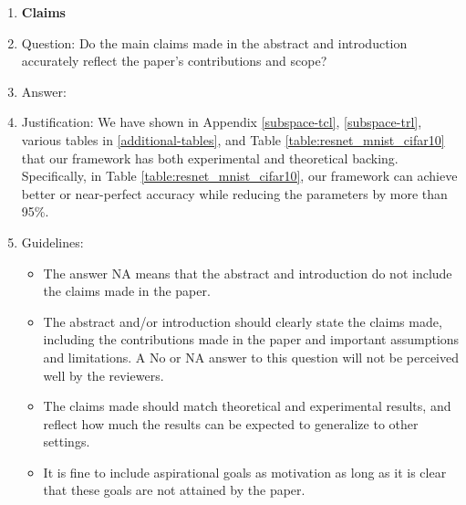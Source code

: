 \documentclass{article}
\begin{document}
%
 



\begin{enumerate}

\item {\bf Claims}
    \item[] Question: Do the main claims made in the abstract and introduction accurately reflect the paper's contributions and scope?
    \item[] Answer: \answerYes{} %
    \item[] Justification: We have shown in Appendix \ref{subspace-tcl}, \ref{subspace-trl}, various tables in \ref{additional-tables}, and Table \ref{table:resnet_mnist_cifar10} that our framework has both experimental and theoretical backing. Specifically, in Table \ref{table:resnet_mnist_cifar10}, our framework can achieve better or near-perfect accuracy while reducing the parameters by more than 95\%. 
    \item[] Guidelines:
    \begin{itemize}
        \item The answer NA means that the abstract and introduction do not include the claims made in the paper.
        \item The abstract and/or introduction should clearly state the claims made, including the contributions made in the paper and important assumptions and limitations. A No or NA answer to this question will not be perceived well by the reviewers. 
        \item The claims made should match theoretical and experimental results, and reflect how much the results can be expected to generalize to other settings. 
        \item It is fine to include aspirational goals as motivation as long as it is clear that these goals are not attained by the paper. 
    \end{itemize}


\end{enumerate}
\end{document}
